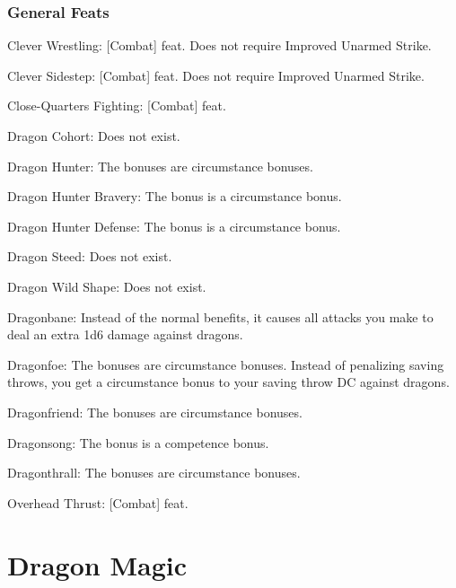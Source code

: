 \subsubsection{General Feats}
\begin{itemize*}
\item Clever Wrestling: [Combat] feat. Does not require Improved Unarmed Strike.
\item Clever Sidestep: [Combat] feat. Does not require Improved Unarmed Strike.
\item Close-Quarters Fighting: [Combat] feat.
\item Dragon Cohort: Does not exist.
\item Dragon Hunter: The bonuses are circumstance bonuses.
\item Dragon Hunter Bravery: The bonus is a circumstance bonus.
\item Dragon Hunter Defense: The bonus is a circumstance bonus.
\item Dragon Steed: Does not exist.
\item Dragon Wild Shape: Does not exist.
\item Dragonbane: Instead of the normal benefits, it causes all attacks you make to deal an extra 1d6 damage against dragons.
\item Dragonfoe: The bonuses are circumstance bonuses. Instead of penalizing saving throws, you get a  circumstance bonus to your saving throw DC against dragons.
\item Dragonfriend: The bonuses are circumstance bonuses.
\item Dragonsong: The bonus is a competence bonus.
\item Dragonthrall: The bonuses are circumstance bonuses.
\item Overhead Thrust: [Combat] feat.
\end{itemize*}
\section{Dragon Magic}
